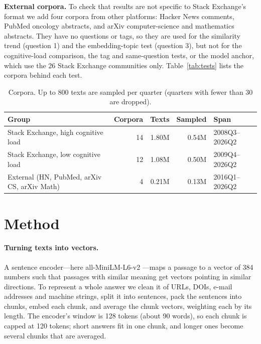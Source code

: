 \documentclass[11pt]{article}
\begin{document}
\textbf{External corpora.} To check that results are not specific to Stack Exchange's format we add
four corpora from other platforms: Hacker News comments, PubMed oncology abstracts, and arXiv
computer-science and mathematics abstracts. They have no questions or tags, so they are used for the
similarity trend (question 1) and the embedding-topic test (question 3), but not for the
cognitive-load comparison, the tag and same-question tests, or the model anchor, which use the 26
Stack Exchange communities only. Table~\ref{tab:tests} lists the corpora behind each test.

\begin{table}[H]
\centering
\caption{Corpora. Up to 800 texts are sampled per quarter (quarters with fewer than 30 are dropped).}
\label{tab:data}
\small
\begin{tabular}{lrrrl}
\toprule
Group & Corpora & Texts & Sampled & Span \\
\midrule
Stack Exchange, high cognitive load & 14 & 1.80M & 0.54M & 2008Q3--2026Q2 \\
Stack Exchange, low cognitive load  & 12 & 1.08M & 0.50M & 2009Q4--2026Q2 \\
External (HN, PubMed, arXiv CS, arXiv Math) & 4 & 0.21M & 0.13M & 2016Q1--2026Q2 \\
\bottomrule
\end{tabular}
\end{table}

\section{Method}

\paragraph{Turning texts into vectors.} A sentence encoder---here all-MiniLM-L6-v2
\citep{reimers2019,wang2020minilm}---maps a passage to a vector of 384 numbers such that passages
with similar meaning get vectors pointing in similar directions. To represent a whole answer we clean
it of URLs, DOIs, e-mail addresses and machine strings, split it into sentences, pack the sentences
into chunks, embed each chunk, and average the chunk vectors, weighting each by its length. The
encoder's window is 128 tokens (about 90 words), so each chunk is capped at 120 tokens; short answers
fit in one chunk, and longer ones become several chunks that are averaged.
\end{document}
